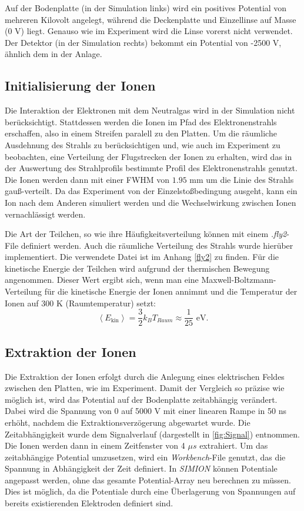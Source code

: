 Auf der Bodenplatte (in der Simulation links) wird ein positives Potential von mehreren Kilovolt angelegt, während die Deckenplatte und Einzellinse auf Masse (0 V) liegt. Genauso wie im Experiment wird die Linse vorerst nicht verwendet. Der Detektor (in der Simulation rechts) bekommt ein Potential von -2500 V, ähnlich dem in der Anlage. 

\subsection{Initialisierung der Ionen}
Die Interaktion der Elektronen mit dem Neutralgas wird in der Simulation nicht berücksichtigt. Stattdessen werden die Ionen im Pfad des Elektronenstrahls erschaffen, also in einem Streifen paralell zu den Platten. Um die räumliche Ausdehnung des Strahls zu berücksichtigen und, wie auch im Experiment zu beobachten, eine Verteilung der Flugstrecken der Ionen zu erhalten, wird das in der Auswertung des Strahlprofils bestimmte Profil des Elektronenstrahls genutzt. Die Ionen werden dann mit einer FWHM von $1.95$ mm um die Linie des Strahls gauß-verteilt. Da das Experiment von der Einzelstoßbedingung ausgeht, kann ein Ion nach dem Anderen simuliert werden und die Wechselwirkung zwischen Ionen vernachlässigt werden.

Die Art der Teilchen, so wie ihre Häufigkeitsverteilung können mit einem \textit{.fly2}-File definiert werden. Auch die räumliche Verteilung des Strahls wurde hierüber implementiert. Die verwendete Datei ist im Anhang \ref{fly2} zu finden. Für die kinetische Energie der Teilchen wird aufgrund der thermischen Bewegung angenommen. Dieser Wert ergibt sich, wenn man eine Maxwell-Boltzmann-Verteilung für die kinetische 
Energie der Ionen annimmt und die Temperatur der Ionen auf 300 K (Raumtemperatur) setzt: 
\begin{equation}
    \label{eq:kin}
    \left< E_{\text{kin}} \right> = \frac{3}{2} k_B T_{Raum} \approx \frac{1}{25} \text{ eV}.
\end{equation}

\subsection{Extraktion der Ionen}
Die Extraktion der Ionen erfolgt durch die Anlegung eines elektrischen Feldes zwischen den Platten, wie im Experiment. Damit der Vergleich so präzise wie möglich ist, wird das Potential auf der Bodenplatte zeitabhängig verändert. Dabei wird die Spannung von 0 auf 5000 V mit einer linearen Rampe in 50 ns erhöht, nachdem die Extraktionsverzögerung abgewartet wurde. Die Zeitabhängigkeit wurde dem Signalverlauf (dargestellt in \ref{fig:Signal}) entnommen. Die Ionen werden dann in einem Zeitfenster von 4 $\mu s$ extrahiert. Um das zeitabhängige Potential umzusetzen, wird ein \textit{Workbench}-File genutzt, das die Spannung in Abhängigkeit der Zeit definiert. In \textit{SIMION} können Potentiale angepasst werden, ohne das gesamte Potential-Array neu berechnen zu müssen. Dies ist möglich, da die Potentiale durch eine Überlagerung von Spannungen auf bereits existierenden Elektroden definiert sind.

